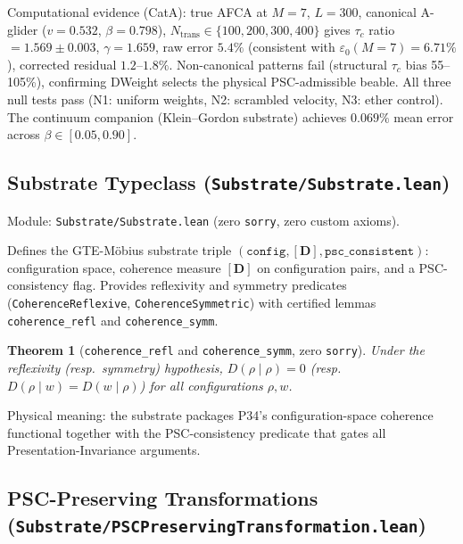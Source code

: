 \documentclass[11pt,a4paper]{article}
\newtheorem{theorem}{Theorem}[section]
\theoremstyle{definition}
\begin{document}
Computational evidence (CatA): true AFCA at $M=7$, $L=300$,
canonical A-glider ($v=0.532$, $\beta=0.798$), $N_\mathrm{trans}\in\{100,200,300,400\}$
gives $\tau_c$ ratio $= 1.569\pm0.003$, $\gamma=1.659$, raw error $5.4\%$
(consistent with $\varepsilon_0(M=7)=6.71\%$), corrected residual $1.2$--$1.8\%$.
Non-canonical patterns fail (structural $\tau_c$ bias 55--105\%), confirming
DWeight selects the physical PSC-admissible beable.  All three null tests pass
(N1: uniform weights, N2: scrambled velocity, N3: ether control).  The
continuum companion (Klein--Gordon substrate) achieves
$0.069\%$ mean error across $\beta\in[0.05,0.90]$.


\subsection{Substrate Typeclass
  (\texttt{Substrate/Substrate.lean})}\label{subsec:substrate-typeclass}

Module: \texttt{Substrate/Substrate.lean} (zero
\lstinline|sorry|, zero custom axioms).

Defines the GTE-Möbius substrate triple $(\mathtt{config}, [\mathbf{D}], \mathtt{psc\_consistent})$:
configuration space, coherence measure $[\mathbf{D}]$ on configuration pairs, and a
PSC-consistency flag.  Provides reflexivity and symmetry predicates
(\lstinline|CoherenceReflexive|, \lstinline|CoherenceSymmetric|) with certified lemmas
\lstinline|coherence_refl| and \lstinline|coherence_symm|.

\begin{theorem}[\lstinline|coherence_refl| and \lstinline|coherence_symm|, zero \texttt{sorry}]
Under the reflexivity (resp.\ symmetry) hypothesis, $D(\rho\mid\rho)=0$
(resp.\ $D(\rho\mid w)=D(w\mid\rho)$) for all configurations $\rho,w$.
\end{theorem}

Physical meaning: the substrate packages P34's configuration-space coherence
functional together with the PSC-consistency predicate that gates all
Presentation-Invariance arguments.

\subsection[PSC-Preserving Transformations (\texttt{PSCPreservingTransformation.lean})]{PSC-Preserving Transformations
  (\texttt{Substrate/\allowbreak PSCPreservingTransformation.lean})}\label{subsec:psc-preserving-transformation}
\end{document}
